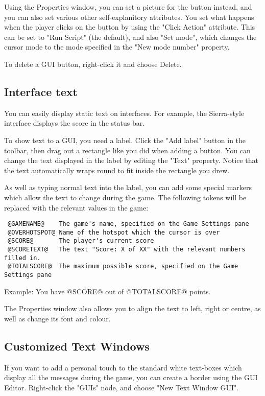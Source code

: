 Using the Properties window, you can set a picture for the button instead,
and you can also set various other self-explanitory attributes.
You set what happens when the player clicks on the button by using the "Click
Action" attribute. This can be set to "Run Script" (the default), and also "Set
mode", which changes the cursor mode to the mode specified in the "New mode number"
property.

To delete a GUI button, right-click it and choose Delete.

\subsection{Interface text}%

You can easily display static text on interfaces. For example, the Sierra-style
interface displays the score in the status bar.

To show text to a GUI, you need a label. Click the "Add label" button in the
toolbar, then drag out a rectangle like you did when adding a button. You can change the
text displayed in the label by editing the "Text" property. Notice that the
text automatically wraps round to fit inside the rectangle you drew.

As well as typing normal text into the label, you can add some special markers
which allow the text to change during the game. The following tokens will be
replaced with the relevant values in the game:
\begin{verbatim}
 @GAMENAME@    The game's name, specified on the Game Settings pane
 @OVERHOTSPOT@ Name of the hotspot which the cursor is over
 @SCORE@       The player's current score
 @SCORETEXT@   The text "Score: X of XX" with the relevant numbers filled in.
 @TOTALSCORE@  The maximum possible score, specified on the Game Settings pane
\end{verbatim}
Example: You have @SCORE@ out of @TOTALSCORE@ points.

The Properties window also allows you to align the text to left, right or
centre, as well as change its font and colour.

\subsection{Customized Text Windows}\label{TextWin}%

If you want to add a personal touch to the standard white text-boxes which
display all the messages during the game, you can create a border using the
GUI Editor. Right-click the "GUIs" node, and choose "New Text Window GUI".

